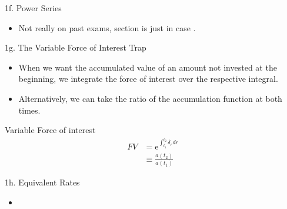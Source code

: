 \begin{CHPT_SUMM_AUTO}[label = {L.-1f}]{1f. Power Series}
	\begin{itemize}[leftmargin = *]
		\item	Not really on past exams, section is \og just in case \fg{}.
	\end{itemize}
\end{CHPT_SUMM_AUTO}

\begin{CHPT_SUMM_AUTO}[label = {L.-1g}]{1g. The Variable Force of Interest Trap}
	\begin{itemize}[leftmargin = *]
		\item	When we want the accumulated value of an amount not invested at the beginning, we integrate the force of interest over the respective integral. 
		\item	Alternatively, we can take the ratio of the accumulation function at both times.
	\end{itemize}

\begin{FORMULA_SUMM}{Variable Force of interest}
\begin{align*}
	FV
	&=	\textrm{e}^{\int_{t_{1}}^{t_{2}}\delta_{r} dr}	\\
	&\equiv	\frac{a(t_{2})}{a(t_{1})}	
\end{align*}
\end{FORMULA_SUMM}
\end{CHPT_SUMM_AUTO}

\begin{CHPT_SUMM_AUTO}[label = {L.-1h}]{1h. Equivalent Rates}
	\begin{itemize}[leftmargin = *]
		\item	
	\end{itemize}
\end{CHPT_SUMM_AUTO}

